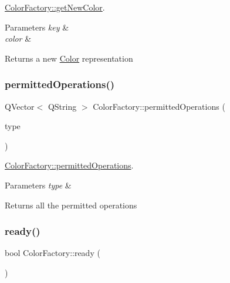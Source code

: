 \hyperlink{class_color_factory_a0b8412fa33dd5eaefff38412a96fc638}{Color\+Factory\+::get\+New\+Color}. 


\begin{DoxyParams}{Parameters}
{\em key} & \\
\hline
{\em color} & \\
\hline
\end{DoxyParams}
\begin{DoxyReturn}{Returns}
a new \hyperlink{class_color}{Color} representation 
\end{DoxyReturn}
\mbox{\label{class_color_factory_a4a6862d52370ea64981f1842dfa6c4f2}} 
\subsubsection{\texorpdfstring{permitted\+Operations()}{permittedOperations()}}
{\footnotesize\ttfamily Q\+Vector$<$ Q\+String $>$ Color\+Factory\+::permitted\+Operations (\begin{DoxyParamCaption}\item[{const Q\+String \&}]{type }\end{DoxyParamCaption})\hspace{0.3cm}{\ttfamily [static]}}



\hyperlink{class_color_factory_a4a6862d52370ea64981f1842dfa6c4f2}{Color\+Factory\+::permitted\+Operations}. 


\begin{DoxyParams}{Parameters}
{\em type} & \\
\hline
\end{DoxyParams}
\begin{DoxyReturn}{Returns}
all the permitted operations 
\end{DoxyReturn}
\mbox{\label{class_color_factory_a998d381b54b7b74ca24a99593030a452}} 
\subsubsection{\texorpdfstring{ready()}{ready()}}
{\footnotesize\ttfamily bool Color\+Factory\+::ready (\begin{DoxyParamCaption}{ }\end{DoxyParamCaption})\hspace{0.3cm}{\ttfamily [static]}}



